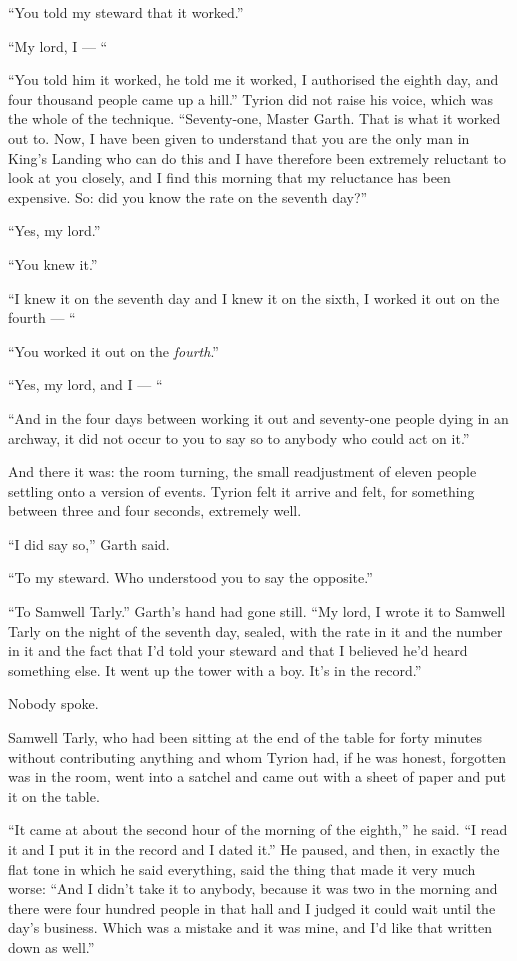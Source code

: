 “You told my steward that it worked.”

“My lord, I — “

“You told him it worked, he told me it worked, I authorised the eighth day, and four thousand people came up a hill.” Tyrion did not raise his voice, which was the whole of the technique. “Seventy-one, Master Garth. That is what it worked out to. Now, I have been given to understand that you are the only man in King’s Landing who can do this and I have therefore been extremely reluctant to look at you closely, and I find this morning that my reluctance has been expensive. So: did you know the rate on the seventh day?”

“Yes, my lord.”

“You knew it.”

“I knew it on the seventh day and I knew it on the sixth, I worked it out on the fourth — “

“You worked it out on the \textit{fourth}.”

“Yes, my lord, and I — “

“And in the four days between working it out and seventy-one people dying in an archway, it did not occur to you to say so to anybody who could act on it.”

And there it was: the room turning, the small readjustment of eleven people settling onto a version of events. Tyrion felt it arrive and felt, for something between three and four seconds, extremely well.

“I did say so,” Garth said.

“To my steward. Who understood you to say the opposite.”

“To Samwell Tarly.” Garth’s hand had gone still. “My lord, I wrote it to Samwell Tarly on the night of the seventh day, sealed, with the rate in it and the number in it and the fact that I’d told your steward and that I believed he’d heard something else. It went up the tower with a boy. It’s in the record.”

\sceneBreak

Nobody spoke.

Samwell Tarly, who had been sitting at the end of the table for forty minutes without contributing anything and whom Tyrion had, if he was honest, forgotten was in the room, went into a satchel and came out with a sheet of paper and put it on the table.

“It came at about the second hour of the morning of the eighth,” he said. “I read it and I put it in the record and I dated it.” He paused, and then, in exactly the flat tone in which he said everything, said the thing that made it very much worse: “And I didn’t take it to anybody, because it was two in the morning and there were four hundred people in that hall and I judged it could wait until the day’s business. Which was a mistake and it was mine, and I’d like that written down as well.”

